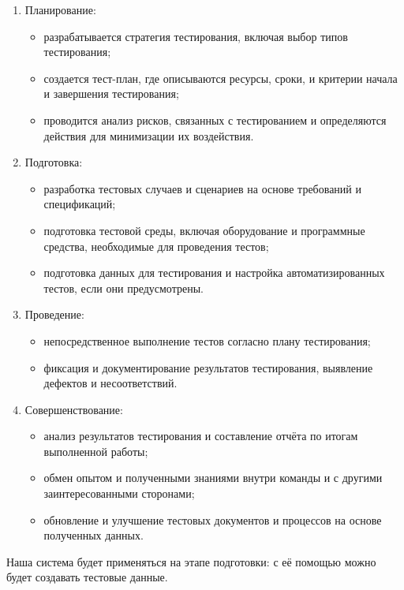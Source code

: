 \begin{enumerate}
    \item Планирование:
    \begin{itemize}
        \item разрабатывается стратегия тестирования, включая выбор типов тестирования;
        \item создается тест-план, где описываются ресурсы, сроки, и критерии начала и завершения тестирования;
        \item проводится анализ рисков, связанных с тестированием и определяются действия для минимизации их воздействия.
    \end{itemize}

    \item Подготовка:
    \begin{itemize}
        \item разработка тестовых случаев и сценариев на основе требований и спецификаций;
        \item подготовка тестовой среды, включая оборудование и программные средства, необходимые для проведения тестов;
        \item подготовка данных для тестирования и настройка автоматизированных тестов, если они предусмотрены.
    \end{itemize}

    \item Проведение:
    \begin{itemize}
        \item непосредственное выполнение тестов согласно плану тестирования;
        \item фиксация и документирование результатов тестирования, выявление дефектов и несоответствий.
    \end{itemize}

    \item Совершенствование:
    \begin{itemize}
        \item анализ результатов тестирования и составление отчёта по итогам выполненной работы;
        \item обмен опытом и полученными знаниями внутри команды и с другими заинтересованными сторонами;
        \item обновление и улучшение тестовых документов и процессов на основе полученных данных.
    \end{itemize}
\end{enumerate}

Наша система будет применяться на этапе подготовки: с её помощью можно будет создавать тестовые данные.

